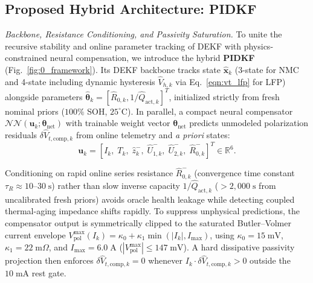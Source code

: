 \documentclass[10pt,a4paper]{article}
\begin{document}
\subsection{Proposed Hybrid Architecture: PIDKF}\label{sec:pidkf}
\emph{Backbone, Resistance Conditioning, and Passivity Saturation.} To unite the recursive stability and online parameter tracking of DEKF with physics-constrained neural compensation, we introduce the hybrid \textbf{PIDKF} (Fig.~\ref{fig:0_framework}). Its DEKF backbone tracks state $\hat{\mathbf{x}}_k$ (3-state for NMC and 4-state including dynamic hysteresis $\hat{V}_{h,k}$ via Eq.~\eqref{eqn:vt_lfp} for LFP) alongside parameters $\hat{\boldsymbol{\theta}}_k = [\hat{R}_{0,k}, 1/\hat{Q}_{\text{act},k}]^T$, initialized strictly from fresh nominal priors ($100\%$ SOH, $25^\circ\text{C}$). In parallel, a compact neural compensator $\mathcal{NN}(\mathbf{u}_k; \boldsymbol{\theta}_{\text{net}})$ with trainable weight vector $\boldsymbol{\theta}_{\text{net}}$ predicts unmodeled polarization residuals $\delta\hat{V}_{t,\text{comp},k}$ from online telemetry and \emph{a priori} states:
\begin{equation}\label{eqn:pidkf_input}
\mathbf{u}_k = \left[I_k,\; T_k,\; \hat{z}_k^-,\; \hat{U}_{1,k}^-,\; \hat{U}_{2,k}^-,\; \hat{R}_{0,k}^-\right]^T \in \mathbb{R}^6.
\end{equation}

Conditioning on rapid online series resistance $\hat{R}_{0,k}^-$ (convergence time constant $\tau_R \approx 10\text{--}30\;\mathrm{s}$) rather than slow inverse capacity $1/\hat{Q}_{\text{act},k}$ ($>2,000\;\mathrm{s}$ from uncalibrated fresh priors) avoids oracle health leakage while detecting coupled thermal-aging impedance shifts rapidly. To suppress unphysical predictions, the compensator output is symmetrically clipped to the saturated Butler--Volmer current envelope $V_{\text{pol}}^{\max}(I_k) = \kappa_0 + \kappa_1 \min(|I_k|, I_{\max})$, using $\kappa_0 = 15\;\mathrm{mV}$, $\kappa_1 = 22\;\mathrm{m}\Omega$, and $I_{\max} = 6.0\;\mathrm{A}$ ($|V_{\text{pol}}^{\max}| \le 147\;\mathrm{mV}$). A hard dissipative passivity projection then enforces $\delta\hat{V}_{t,\text{comp},k} = 0$ whenever $I_k \cdot \delta\hat{V}_{t,\text{comp},k} > 0$ outside the $10\;\mathrm{mA}$ rest gate.
\end{document}
